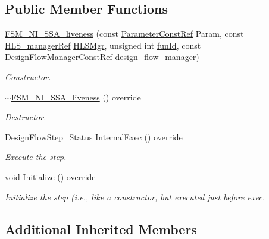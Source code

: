 \subsection*{Public Member Functions}
\begin{DoxyCompactItemize}
\item 
\hyperlink{classFSM__NI__SSA__liveness_a52fd80199f84c554035ca0b2a50bf11e}{F\+S\+M\+\_\+\+N\+I\+\_\+\+S\+S\+A\+\_\+liveness} (const \hyperlink{Parameter_8hpp_a37841774a6fcb479b597fdf8955eb4ea}{Parameter\+Const\+Ref} Param, const \hyperlink{hls__manager_8hpp_acd3842b8589fe52c08fc0b2fcc813bfe}{H\+L\+S\+\_\+manager\+Ref} \hyperlink{classHLS__step_ade85003a99d34134418451ddc46a18e9}{H\+L\+S\+Mgr}, unsigned int \hyperlink{classHLSFunctionStep_a3e6434fd86c698b0c70520b859bff5b0}{fun\+Id}, const Design\+Flow\+Manager\+Const\+Ref \hyperlink{classDesignFlowStep_ab770677ddf087613add30024e16a5554}{design\+\_\+flow\+\_\+manager})
\begin{DoxyCompactList}\small\item\em Constructor. \end{DoxyCompactList}\item 
\hyperlink{classFSM__NI__SSA__liveness_ad6fef7469f1ee413ab05d4ee208fc97e}{$\sim$\+F\+S\+M\+\_\+\+N\+I\+\_\+\+S\+S\+A\+\_\+liveness} () override
\begin{DoxyCompactList}\small\item\em Destructor. \end{DoxyCompactList}\item 
\hyperlink{design__flow__step_8hpp_afb1f0d73069c26076b8d31dbc8ebecdf}{Design\+Flow\+Step\+\_\+\+Status} \hyperlink{classFSM__NI__SSA__liveness_a4779c2c3c70f08d16a164de63ecc25e9}{Internal\+Exec} () override
\begin{DoxyCompactList}\small\item\em Execute the step. \end{DoxyCompactList}\item 
void \hyperlink{classFSM__NI__SSA__liveness_a36cbd84735c2126d760d7fbdadab9d5e}{Initialize} () override
\begin{DoxyCompactList}\small\item\em Initialize the step (i.\+e., like a constructor, but executed just before exec. \end{DoxyCompactList}\end{DoxyCompactItemize}
\subsection*{Additional Inherited Members}



